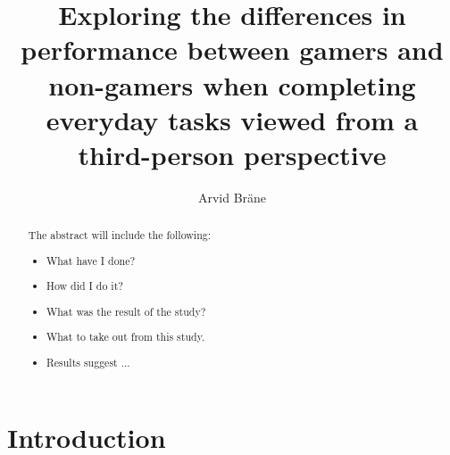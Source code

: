 \documentclass[runningheads,a4paper,oribibl]{llncs}
\begin{document}
\pagestyle{headings}

\mainmatter

\title{Exploring the differences in performance between gamers and non-gamers when completing everyday tasks viewed from a third-person perspective}



\author{Arvid Bräne}


\maketitle


\begin{abstract}
	

The abstract will include the following:
\begin{itemize}
	\item What have I done?
	\item How did I do it?
	\item What was the result of the study?
	\item What to take out from this study.
	\item Results suggest ...
\end{itemize}

\end{abstract}











\section{Introduction}
\end{document}
